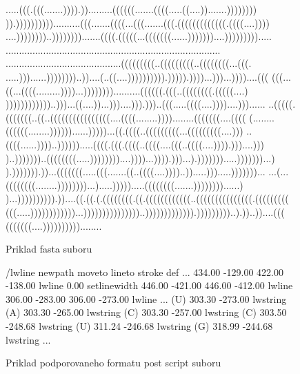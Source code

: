 \begin{figure}[H]
\begin{code}[fontsize=\scriptsize, frame=none, samepage=true]
.....(((.(((.......)))).)).........((((((.......((((.....((....)).......))))))))
)).))))))))))..........(((.......((((...(((.......(((.(((((((((((((.((((....))))
....))))))))..)))))))).......((((.(((((...(((((((......)))))))....))))))))).....
................................................................................
...........................................(((((((((..(((((((((..((((((((...(((.
.....)))......))))))))..))....(..((....)))))))))).))))).))))...)))...))))....(((
(((...((...((((.........))))...))))))))..........((((((.(((..((((((((.(((((....)
))))))))))))..)))...((....))...)))....))).)))..(((.....((((....))))....)))......
..(((((.(((((((..((..((((((((((((((((....((((........))))........(((((((....((((
(........((((((........))))))......)))))...((.((((..(((((((((...(((((((((....)))
..((((......))))..)))))).....((((.(((.((((..((((....(((..((((....)))).)))....)))
)..)))))))..((((((((.....))))))))....))))...)))).)))...).))))))).....)))))))...)
).))))))).))...(((((((.....(((.......((..((((....))))..)).....))).....)))))))...
...(...((((((((........))))))))...).....))))).....((((((((.......))))))))......)
)...)))))))))).))....((.((.(.((((((((.((.((((((((((((..(((((((((((((((.(((((((((
(((.....))))))))))))...)))))))))))))))..))))))))))))).)))))))))..).))..))....(((
(((((((....))))))))))........
\end{code}
\caption{Priklad fasta suboru}
\label{obr:mouse_fasta}
\end{figure}

\begin{figure}[H]
\begin{code}[fontsize=\scriptsize, frame=none, samepage=true]
/lwline {newpath moveto lineto stroke} def
  ...
434.00 -129.00 422.00 -138.00 lwline
0.00 setlinewidth
446.00 -421.00 446.00 -412.00 lwline
306.00 -283.00 306.00 -273.00 lwline
  ...
(U) 303.30 -273.00 lwstring
(A) 303.30 -265.00 lwstring
(C) 303.30 -257.00 lwstring
(C) 303.50 -248.68 lwstring
(U) 311.24 -246.68 lwstring
(G) 318.99 -244.68 lwstring
  ...
\end{code}
\caption{Priklad podporovaneho formatu post script suboru}
\label{obr:mouse_ps_text}
\end{figure}

